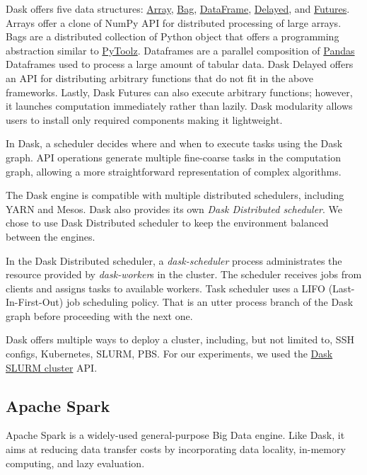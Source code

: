 \documentclass[conference]{IEEEtran}
\begin{document}
Dask offers five data structures:
\href{https://docs.dask.org/en/latest/array.html}{Array},
\href{https://docs.dask.org/en/latest/bag.html}{Bag},
\href{https://docs.dask.org/en/latest/dataframe.html}{DataFrame},
\href{https://docs.dask.org/en/latest/delayed.html}{Delayed},
and \href{https://docs.dask.org/en/latest/futures.html}{Futures}.
Arrays offer a clone of NumPy API for distributed processing of large arrays.
Bags are a distributed collection of Python object that offers a programming abstraction similar to \href{https://toolz.readthedocs.io/en/latest/}{PyToolz}.
Dataframes are a parallel composition of \href{https://pandas.pydata.org/}{Pandas} Dataframes used to process a large amount of tabular data.
Dask Delayed offers an API for distributing arbitrary functions that do not fit in the above frameworks.
Lastly, Dask Futures can also execute arbitrary functions; however, it launches computation immediately rather than lazily.
Dask modularity allows users to install only required components making it lightweight.

In Dask, a scheduler decides where and when to execute tasks using the Dask graph.
API operations generate multiple fine-coarse tasks in the computation graph, allowing a more straightforward representation of complex algorithms.

The Dask engine is compatible with multiple distributed schedulers, including YARN and Mesos.
Dask also provides its own \textit{Dask Distributed scheduler}.
We chose to use Dask Distributed scheduler to keep the environment balanced between the engines.

In the Dask Distributed scheduler, a \textit{dask-scheduler} process administrates the resource provided by  \textit{dask-worker}s in the cluster.
The scheduler receives jobs from clients and assigns tasks to available workers.
Task scheduler uses a LIFO (Last-In-First-Out) job scheduling policy.
That is an utter process branch of the Dask graph before proceeding with the next one.

Dask offers multiple ways to deploy a cluster, including, but not limited to, SSH configs, Kubernetes, SLURM, PBS.
For our experiments, we used the \href{https://jobqueue.dask.org/en/latest/generated/dask_jobqueue.SLURMCluster.html}{Dask SLURM cluster} API.

\subsection{Apache Spark}
Apache Spark is a widely-used general-purpose Big Data engine.
Like Dask, it aims at reducing data transfer costs by incorporating data locality, in-memory computing, and lazy evaluation.
\end{document}
